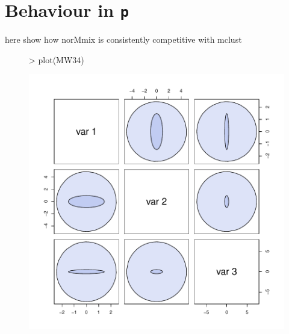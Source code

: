 \section{Behaviour in {\tt p}}

here show how norMmix is consistently competitive with mclust

\begin{figure}[h]
\begin{Schunk}
\begin{Sinput}
>     plot(MW34)
\end{Sinput}
\end{Schunk}
\includegraphics{chapter3-figMW34}
\end{figure}



